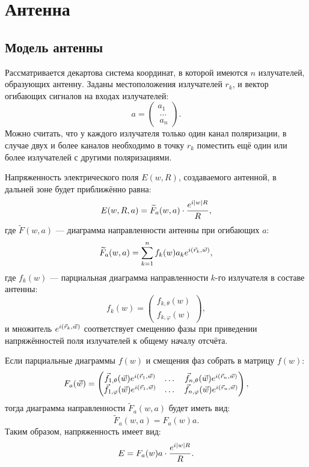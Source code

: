 \chapter{Антенна}

\section{Модель антенны}

Рассматривается декартова система координат, в которой имеются $n$ излучателей, образующих антенну. Заданы местоположения излучателей $r_k$, и вектор огибающих
сигналов на входах излучателей:
\[
    a
    = \begin{pmatrix}
          a_1 \\\
          \dots \\\
          a_n
    \end{pmatrix} .
\]
Можно считать, что у каждого излучателя только один канал поляризации, в случае двух и более каналов необходимо в точку $r_k$ поместить ещё один или более
излучателей с другими поляризациями.

Напряженность электрического поля $E(w,R)$, создаваемого антенной, в дальней зоне будет приближённо равна:
\[
    E(w,R,a) = \widetilde{F}_a(w,a) \cdot \frac{e^{i \left | w \right | R}}{R} ,
\]
где $\widetilde{F}(w,a)$ --- диаграмма направленности антенны при огибающих $a$:
\[
    \widetilde{F}_a(w,a) = \sum_{k=1}^n f_k(w) a_k e^{i \left ( \vec{r}_k, \vec{w} \right )} ,
\]
где $f_k(w)$ --- парциальная диаграмма направленности $k$-го излучателя в составе антенны:
\[
    f_k(w) =
    \begin{pmatrix}
        f_{k,\theta}(w) \\
        f_{k,\varphi}(w)
    \end{pmatrix}
    ,
\]
и множитель $e^{i \left ( \vec{r}_k, \vec{w} \right )}$ соответствует смещению фазы при приведении напряжённостей поля излучателей к общему началу отсчёта.

Если парциальные диаграммы $f(w)$ и смещения фаз собрать в матрицу $f(w)$:
\begin{gather*}
    F_a(\vec{w}) =
    \begin{pmatrix}
        \vec{f}_{1,\theta}(\vec{w}) e^{i \left ( \vec{r}_1, \vec{w} \right )}  & \dots & \vec{f}_{n,\theta}(\vec{w}) e^{i \left ( \vec{r}_n, \vec{w} \right )}  \\
        \vec{f}_{1,\varphi}(\vec{w}) e^{i \left ( \vec{r}_1, \vec{w} \right )} & \dots & \vec{f}_{n,\varphi}(\vec{w}) e^{i \left ( \vec{r}_n, \vec{w} \right )}
    \end{pmatrix} ,
\end{gather*}
тогда диаграмма направленности $\widetilde{F}_a(w,a)$ будет иметь вид:
\[
    \widetilde{F}_a(w,a) = F_a(w) a.
\]
Таким образом, напряженность имеет вид:
\[
    E = F_a(w) a \cdot \frac{e^{i \left | w \right | R}}{R} .
\]